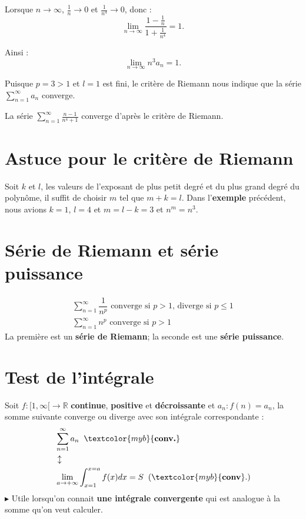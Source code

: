 \documentclass{report}
\begin{document}
\begin{multicols*}{3}
Lorsque $n \to \infty$, $\frac{1}{n} \to 0$ et $\frac{1}{n^4} \to 0$, donc :
\[
\lim_{n \to \infty} \frac{1 - \frac{1}{n}}{1 + \frac{1}{n^4}} = 1.
\]

Ainsi :
\[
\lim_{n \to \infty} n^3 a_n = 1.
\]


Puisque $p = 3 > 1$ et $l = 1$ est fini, le critère de Riemann nous indique que
la série $\sum_{n=1}^\infty a_n$ converge.


La série $\displaystyle \sum_{n=1}^\infty \frac{n - 1}{n^4 + 1}$ converge
d’après le critère de Riemann.



    \section{Astuce pour le critère de Riemann}
    Soit $k$ et $l$, les valeurs de l'exposant de plus petit degré et du plus grand 
    degré du polynôme, il suffit de choisir $m$ tel que $m + k = l$.  
    Dans l'\textcolor{myb}{\textbf{exemple}} précédent, nous avions                 
    $k = 1$, $l = 4$ et $m = l - k  = 3$ et $n^m = n^3$.  

    \section{Série de Riemann et série puissance} 
    \vspace{-1em}
    \begin{align*}
        \sum_{n=1}^{\infty }\dfrac{1}{n^p} 
        \text{ converge si } p > 1 \text{, diverge si } p \leq 1
        \\
        \sum_{n=1}^{\infty }n^p \text{ converge  si }
         p > 1 
    \end{align*}
    La première est un \textbf{série de Riemann}; la seconde 
    est une \textbf{série puissance}. 

    \section{Test de l'intégrale}
    Soit $f : [1, \infty [ \rightarrow  \mathbb{R}$ 
    \textbf{continue}, \textbf{positive} et \textbf{décroissante} 
    et $a_n : f(n) = a_n$, la somme suivante converge ou diverge avec 
    son intégrale correspondante :
    \begin{align*}
        &\sum_{n=1}^{\infty }a_n \;\; \textcolor{myb}{\textbf{conv.}} 
        \\
        & \updownarrow 
        \\
        &\lim\limits_{a \to +\infty }\int_{x=1}^{x = a}f(x)dx = S \;\; 
        (\textcolor{myb}{\textbf{conv}}.)    
    \end{align*}
    $\blacktriangleright$ Utile lorsqu'on connait \textbf{une intégrale convergente} qui est 
    analogue à la somme qu'on veut calculer. 





\end{multicols*}
\end{document}
